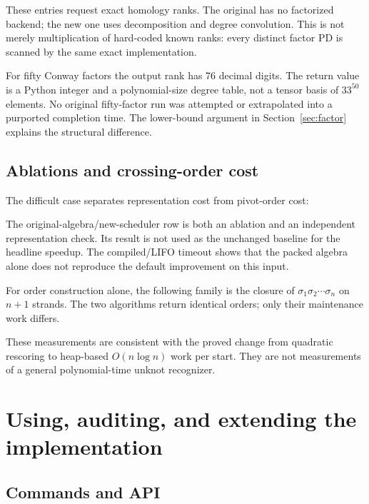 \documentclass[11pt]{article}
\begin{document}
These entries request exact homology ranks. The original has no factorized
backend; the new one uses decomposition and degree convolution. This is not
merely multiplication of hard-coded known ranks: every distinct factor PD is
scanned by the same exact implementation.

\FactorBenchmarkTable

For fifty Conway factors the output rank has 76 decimal digits. The return
value is a Python integer and a polynomial-size degree table, not a tensor
basis of $33^{50}$ elements. No original fifty-factor run was attempted or
extrapolated into a purported completion time. The lower-bound argument in
Section~\ref{sec:factor} explains the structural difference.

\subsection{Ablations and crossing-order cost}

The difficult case separates representation cost from pivot-order cost:

\AblationBenchmarkTable

The original-algebra/new-scheduler row is both an ablation and an independent
representation check. Its result is not used as the unchanged baseline for the
headline speedup. The compiled/LIFO timeout shows that the packed algebra alone
does not reproduce the default improvement on this input.

For order construction alone, the following family is the closure of
$\sigma_1\sigma_2\cdots\sigma_n$ on $n+1$ strands. The two algorithms return
identical orders; only their maintenance work differs.

\OrderingBenchmarkTable

These measurements are consistent with the proved change from quadratic
rescoring to heap-based $O(n\log n)$ work per start. They are not measurements
of a general polynomial-time unknot recognizer.

\section{Using, auditing, and extending the implementation}

\subsection{Commands and API}
\end{document}
